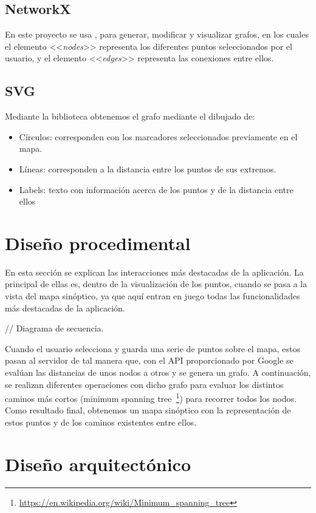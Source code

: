 \subsection{NetworkX}
En este proyecto se usa , para generar, modificar y visualizar grafos, en los cuales el elemento <<\textit{nodes}>> representa los diferentes puntos seleccionados por el usuario, y el elemento <<\textit{edges}>> representa las conexiones entre ellos.


\subsection{SVG}
Mediante la biblioteca  obtenemos el grafo mediante el dibujado de:
\begin{itemize}
	\item Círculos: corresponden con los marcadores seleccionados previamente en el mapa.
	\item Líneas: corresponden a la distancia entre los puntos de sus extremos.
	\item Labels: texto con información acerca de los puntos y de la distancia entre ellos
\end{itemize}


\section{Diseño procedimental}
En esta sección se explican las interacciones más destacadas de la aplicación. La principal de ellas es, dentro de la visualización de los puntos, cuando se pasa a la vista del mapa sinóptico, ya que aquí entran en juego todas las funcionalidades más destacadas de la aplicación.


// Diagrama de secuencia.


Cuando el usuario selecciona y guarda una serie de puntos sobre el mapa, estos pasan al servidor de tal manera que, con el API proporcionado por Google se evalúan las distancias de unos nodos a otros y se genera un grafo. A continuación, se realizan diferentes operaciones con dicho grafo para evaluar los distintos caminos más cortos (minimum spanning tree~\footnote{\url{https://en.wikipedia.org/wiki/Minimum_spanning_tree}}) para recorrer todos los nodos. \\
Como resultado final, obtenemos un mapa sinóptico con la representación de estos puntos y de los caminos existentes entre ellos.


\section{Diseño arquitectónico}

